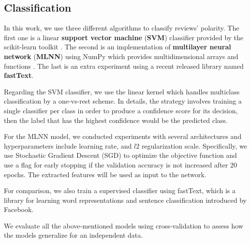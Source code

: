 \documentclass[conference,compsoc]{IEEEtran}
\begin{document}








\subsection{Classification}
In this work, we use three different algorithms to classify reviews' polarity. The first one is a linear \textbf{support vector machine} (\textbf{SVM}) classifier provided by the scikit-learn toolkit \cite{scikit-learn}. The second is an implementation of \textbf{multilayer neural network} (\textbf{MLNN}) using NumPy which provides multidimensional arrays and functions \cite{Walt:2011:NAS:1957373.1957466}. The last is an extra experiment using a recent released library named \textbf{fastText}\cite{joulin2016bag}.

Regarding the SVM classifier, we use the linear kernel which handles multiclass classification by a one-vs-rest scheme. In details, the strategy involves training a single classifier per class in order to produce a confidence score for its decision, then the label that has the highest confidence would be the predicted class.

For the MLNN model, we conducted experiments with several architectures and hyperparameters include learning rate, and $l2$ regularization scale. Specifically, we use Stochastic Gradient Descent (SGD) to optimize the objective function and use a flag for early stopping if the validation accuracy is not increased after 20 epochs. The extracted features will be used as input to the network.

For comparison, we also train a supervised classifier using fastText, which is a library for learning word representations and sentence classification introduced by Facebook.

We evaluate all the above-mentioned models using cross-validation to assess how the models generalize for an independent data.
\end{document}
